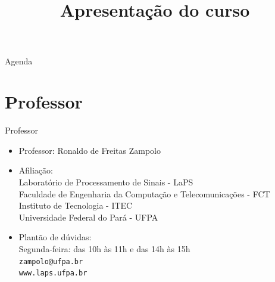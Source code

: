


\title{\cursogrande\\ \vspace{1cm}Apresentação do curso}


   \maketitle[randomdots={false}]
   \begin{slide}{Agenda}
      \tableofcontents[content=sections]
   \end{slide}

   \section[ slide = true]{Professor }
      \begin{slide}[toc=]{Professor}
         \begin{itemize}
            \item Professor: Ronaldo de Freitas Zampolo
            \item Afiliação:\\
                  Laboratório de Processamento de Sinais - LaPS\\
                  Faculdade de Engenharia da Computação e Telecomunicações - FCT\\
                  Instituto de Tecnologia - ITEC\\
                  Universidade Federal do Pará - UFPA\\
            \item Plantão de dúvidas:\\
		  Segunda-feira: das 10h às 11h e das 14h às 15h\\
                  \texttt{zampolo@ufpa.br}\\ 
                  \texttt{www.laps.ufpa.br}
         \end{itemize}
      \end{slide}
      
